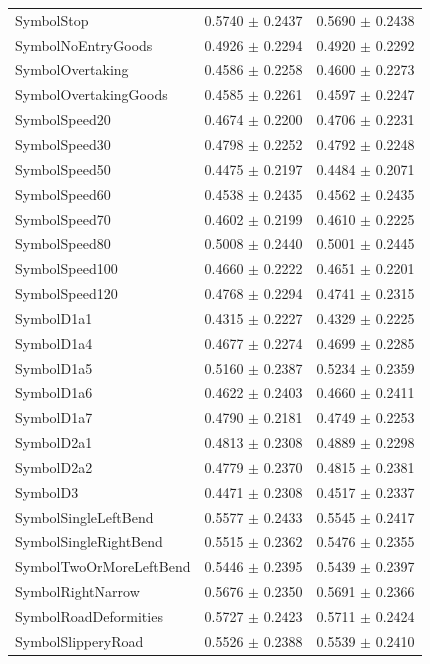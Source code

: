 \begin{longtable}{@{}lrr@{}}
SymbolStop & 0.5740 $\pm$ 0.2437 & 0.5690 $\pm$ 0.2438 \\
SymbolNoEntryGoods & 0.4926 $\pm$ 0.2294 & 0.4920 $\pm$ 0.2292 \\
SymbolOvertaking & 0.4586 $\pm$ 0.2258 & 0.4600 $\pm$ 0.2273 \\
SymbolOvertakingGoods & 0.4585 $\pm$ 0.2261 & 0.4597 $\pm$ 0.2247 \\
SymbolSpeed20 & 0.4674 $\pm$ 0.2200 & 0.4706 $\pm$ 0.2231 \\
SymbolSpeed30 & 0.4798 $\pm$ 0.2252 & 0.4792 $\pm$ 0.2248 \\
SymbolSpeed50 & 0.4475 $\pm$ 0.2197 & 0.4484 $\pm$ 0.2071 \\
SymbolSpeed60 & 0.4538 $\pm$ 0.2435 & 0.4562 $\pm$ 0.2435 \\
SymbolSpeed70 & 0.4602 $\pm$ 0.2199 & 0.4610 $\pm$ 0.2225 \\
SymbolSpeed80 & 0.5008 $\pm$ 0.2440 & 0.5001 $\pm$ 0.2445 \\
SymbolSpeed100 & 0.4660 $\pm$ 0.2222 & 0.4651 $\pm$ 0.2201 \\
SymbolSpeed120 & 0.4768 $\pm$ 0.2294 & 0.4741 $\pm$ 0.2315 \\
SymbolD1a1 & 0.4315 $\pm$ 0.2227 & 0.4329 $\pm$ 0.2225 \\
SymbolD1a4 & 0.4677 $\pm$ 0.2274 & 0.4699 $\pm$ 0.2285 \\
SymbolD1a5 & 0.5160 $\pm$ 0.2387 & 0.5234 $\pm$ 0.2359 \\
SymbolD1a6 & 0.4622 $\pm$ 0.2403 & 0.4660 $\pm$ 0.2411 \\
SymbolD1a7 & 0.4790 $\pm$ 0.2181 & 0.4749 $\pm$ 0.2253 \\
SymbolD2a1 & 0.4813 $\pm$ 0.2308 & 0.4889 $\pm$ 0.2298 \\
SymbolD2a2 & 0.4779 $\pm$ 0.2370 & 0.4815 $\pm$ 0.2381 \\
SymbolD3 & 0.4471 $\pm$ 0.2308 & 0.4517 $\pm$ 0.2337 \\
SymbolSingleLeftBend & 0.5577 $\pm$ 0.2433 & 0.5545 $\pm$ 0.2417 \\
SymbolSingleRightBend & 0.5515 $\pm$ 0.2362 & 0.5476 $\pm$ 0.2355 \\
SymbolTwoOrMoreLeftBend & 0.5446 $\pm$ 0.2395 & 0.5439 $\pm$ 0.2397 \\
SymbolRightNarrow & 0.5676 $\pm$ 0.2350 & 0.5691 $\pm$ 0.2366 \\
SymbolRoadDeformities & 0.5727 $\pm$ 0.2423 & 0.5711 $\pm$ 0.2424 \\
SymbolSlipperyRoad & 0.5526 $\pm$ 0.2388 & 0.5539 $\pm$ 0.2410 \\

\end{longtable}
